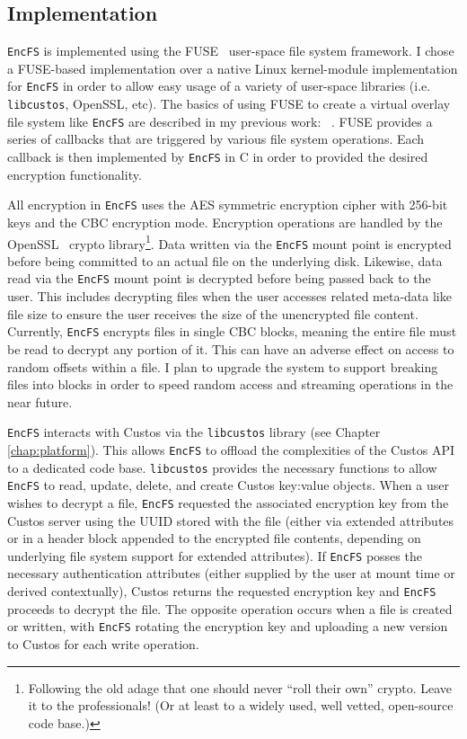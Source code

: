 \subsection{Implementation}

\texttt{EncFS} is implemented using the FUSE~\cite{fuse} user-space
file system framework. I chose a FUSE-based implementation over a
native Linux kernel-module implementation for \texttt{EncFS} in order
to allow easy usage of a variety of user-space libraries
(i.e. \texttt{libcustos}, OpenSSL, etc). The basics of using FUSE to
create a virtual overlay file system like \texttt{EncFS} are
described in my previous work: ~\cite{sayler-os-encfs}. FUSE provides
a series of callbacks that are triggered by various file system
operations. Each callback is then implemented by \texttt{EncFS} in C
in order to provided the desired encryption functionality.

All encryption in \texttt{EncFS} uses the AES symmetric encryption
cipher with 256-bit keys and the CBC encryption mode. Encryption
operations are handled by the OpenSSL~\cite{openssl} crypto
library\footnote{Following the old adage that one should never ``roll
  their own'' crypto. Leave it to the professionals! (Or at least to a
  widely used, well vetted, open-source code base.)}. Data written via
the \texttt{EncFS} mount point is encrypted before being committed to
an actual file on the underlying disk. Likewise, data read via the
\texttt{EncFS} mount point is decrypted before being passed back to
the user. This includes decrypting files when the user accesses
related meta-data like file size to ensure the user receives the size
of the unencrypted file content. Currently, \texttt{EncFS} encrypts
files in single CBC blocks, meaning the entire file must be read to
decrypt any portion of it. This can have an adverse effect on access
to random offsets within a file. I plan to upgrade the system to
support breaking files into blocks in order to speed random access and
streaming operations in the near future.

\texttt{EncFS} interacts with Custos via the \texttt{libcustos}
library (see Chapter \ref{chap:platform}). This allows \texttt{EncFS}
to offload the complexities of the Custos API to a dedicated code
base. \texttt{libcustos} provides the necessary functions to allow
\texttt{EncFS} to read, update, delete, and create Custos key:value
objects. When a user wishes to decrypt a file, \texttt{EncFS}
requested the associated encryption key from the Custos server using
the UUID stored with the file (either via extended attributes or in a
header block appended to the encrypted file contents, depending on
underlying file system support for extended attributes). If
\texttt{EncFS} posses the necessary authentication attributes (either
supplied by the user at mount time or derived contextually), Custos
returns the requested encryption key and \texttt{EncFS} proceeds to
decrypt the file. The opposite operation occurs when a file is created
or written, with \texttt{EncFS} rotating the encryption key and
uploading a new version to Custos for each write operation.

